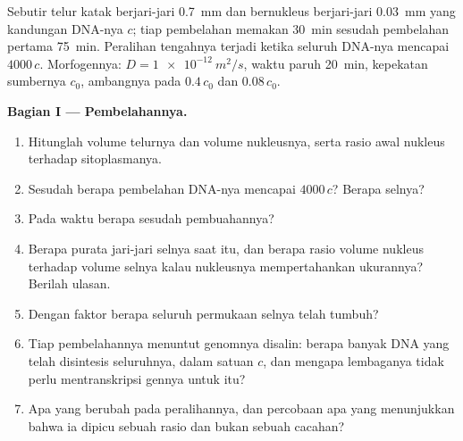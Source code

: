 \begin{problem}
\label{pb:b2:vertebrate-development:1}
Sebutir telur katak berjari-jari \qty{0.7}{mm} dan bernukleus
berjari-jari \qty{0.03}{mm} yang kandungan DNA-nya $c$; tiap pembelahan
memakan \qty{30}{min} sesudah pembelahan pertama \qty{75}{min}.
Peralihan  tengahnya terjadi ketika seluruh DNA-nya mencapai
$4000\,c$. Morfogennya: $D =
\qty{1e-12}{m^2/s}$, waktu paruh
\qty{20}{min}, kepekatan sumbernya $c_0$, ambangnya pada $0.4\,c_0$ dan
$0.08\,c_0$.

\medskip
\noindent\textbf{Bagian I --- Pembelahannya.}
\begin{enumerate}
  \item Hitunglah volume telurnya dan volume nukleusnya, serta rasio
        awal nukleus terhadap sitoplasmanya.
  \item Sesudah berapa pembelahan DNA-nya mencapai $4000\,c$? Berapa
        selnya?
  \item Pada waktu berapa sesudah pembuahannya?
  \item Berapa purata jari-jari selnya saat itu, dan berapa rasio
        volume nukleus terhadap volume selnya kalau nukleusnya
        mempertahankan ukurannya? Berilah ulasan.
  \item Dengan faktor berapa seluruh permukaan selnya telah tumbuh?
  \item Tiap pembelahannya menuntut genomnya disalin: berapa banyak DNA
        yang telah disintesis seluruhnya, dalam satuan $c$, dan mengapa
        lembaganya tidak perlu mentranskripsi gennya untuk itu?
  \item Apa yang berubah pada peralihannya, dan percobaan apa yang
        menunjukkan bahwa ia dipicu sebuah rasio dan bukan sebuah
        cacahan?
\end{enumerate}


\end{problem}
